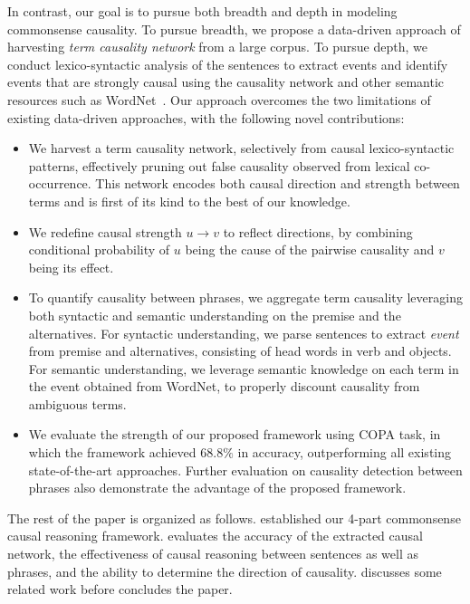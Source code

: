 In contrast, our goal is to pursue both breadth and depth in modeling
commonsense causality.
To pursue breadth, we propose a data-driven approach of harvesting
\emph{term causality network} from a large corpus.
To pursue depth, we conduct lexico-syntactic analysis of the sentences to
extract events and identify events that are strongly causal using the causality network
and other semantic resources such as WordNet~\cite{Miller1995}.
Our approach overcomes the two limitations of existing data-driven approaches,
with the following novel contributions:
\begin{itemize}
\item We harvest a term causality network, selectively from causal
lexico-syntactic patterns, effectively pruning out false causality observed
from lexical co-occurrence.
This network encodes both causal direction and strength between terms and
is first of its kind to the best of our knowledge.
\item We redefine causal strength $u \rightarrow v$ to reflect directions, by combining conditional probability
of $u$ being the cause of the pairwise causality and $v$ being its effect.
\item To quantify causality between phrases, we aggregate term causality
leveraging both syntactic and semantic understanding on the premise
and the alternatives. For syntactic understanding, we parse sentences to
extract \emph{event} from premise and alternatives, consisting of head words
in verb and objects. For semantic understanding, we leverage
semantic knowledge on each term in the event obtained from WordNet,
to properly discount causality from ambiguous terms.
\item We evaluate the strength of our proposed framework using COPA task,
in which the framework achieved $68.8\%$ in accuracy, outperforming
all existing state-of-the-art approaches. Further evaluation on causality
detection between phrases also demonstrate the advantage of the proposed
framework.
\end{itemize}

The rest of the paper is organized as follows. 
established our 4-part commonsense causal reasoning framework.
 evaluates the accuracy of the extracted causal network,
the effectiveness of causal reasoning between sentences as well as phrases,
and the ability to determine the direction of causality. 
discusses some related work before  concludes the paper.
